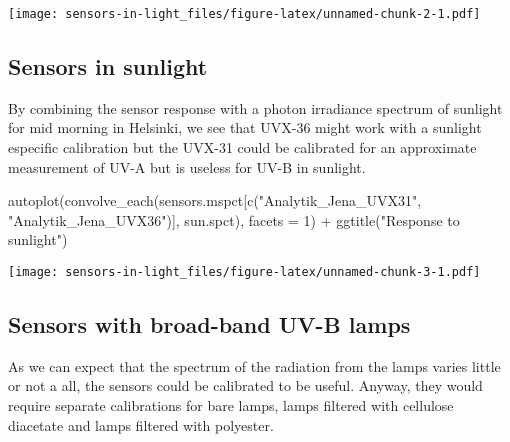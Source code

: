 \documentclass[
]{article}
\newenvironment{Shaded}{\begin{snugshade}}{\end{snugshade}}
\newcommand{\AttributeTok}[1]{\textcolor[rgb]{0.77,0.63,0.00}{#1}}
\newcommand{\DecValTok}[1]{\textcolor[rgb]{0.00,0.00,0.81}{#1}}
\newcommand{\FloatTok}[1]{\textcolor[rgb]{0.00,0.00,0.81}{#1}}
\newcommand{\FunctionTok}[1]{\textcolor[rgb]{0.00,0.00,0.00}{#1}}
\newcommand{\NormalTok}[1]{#1}
\newcommand{\SpecialCharTok}[1]{\textcolor[rgb]{0.00,0.00,0.00}{#1}}
\newcommand{\StringTok}[1]{\textcolor[rgb]{0.31,0.60,0.02}{#1}}
\begin{document}
\texttt{[image: sensors-in-light\_files/figure-latex/unnamed-chunk-2-1.pdf]}

\hypertarget{sensors-in-sunlight}{%
\subsection{Sensors in sunlight}\label{sensors-in-sunlight}}

By combining the sensor response with a photon irradiance spectrum of
sunlight for mid morning in Helsinki, we see that UVX-36 might work with
a sunlight especific calibration but the UVX-31 could be calibrated for
an approximate measurement of UV-A but is useless for UV-B in sunlight.

\begin{Shaded}
\begin{Highlighting}[]
\FunctionTok{autoplot}\NormalTok{(}\FunctionTok{convolve\_each}\NormalTok{(sensors.mspct[}\FunctionTok{c}\NormalTok{(}\StringTok{"Analytik\_Jena\_UVX31"}\NormalTok{, }\StringTok{"Analytik\_Jena\_UVX36"}\NormalTok{)], sun.spct),}
         \AttributeTok{facets =} \DecValTok{1}\NormalTok{) }\SpecialCharTok{+}
  \FunctionTok{ggtitle}\NormalTok{(}\StringTok{"Response to sunlight"}\NormalTok{)}
\end{Highlighting}
\end{Shaded}

\texttt{[image: sensors-in-light\_files/figure-latex/unnamed-chunk-3-1.pdf]}

\hypertarget{sensors-with-broad-band-uv-b-lamps}{%
\subsection{Sensors with broad-band UV-B
lamps}\label{sensors-with-broad-band-uv-b-lamps}}

As we can expect that the spectrum of the radiation from the lamps
varies little or not a all, the sensors could be calibrated to be
useful. Anyway, they would require separate calibrations for bare lamps,
lamps filtered with cellulose diacetate and lamps filtered with
polyester.

\begin{Shaded}
\end{Shaded}
\end{document}
